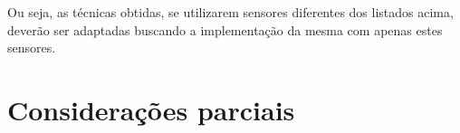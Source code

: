 	Ou seja, as técnicas obtidas, se utilizarem sensores diferentes dos listados acima, deverão ser adaptadas buscando a implementação da mesma com apenas estes sensores.
	


\section{Considerações parciais} %
\label{sec:considerações_parciais}

